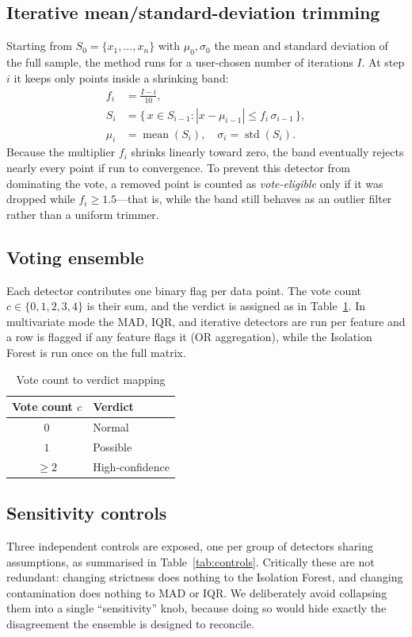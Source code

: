 \documentclass[conference]{IEEEtran}
\begin{document}
\subsection{Iterative mean/standard-deviation trimming}
Starting from $S_0 = \{x_1,\dots,x_n\}$ with $\mu_0,\sigma_0$ the mean and standard deviation of the full sample, the method runs for a user-chosen number of iterations $I$. At step $i$ it keeps only points inside a shrinking band:
\begin{align}
f_i &= \frac{I - i}{10}, \\
S_i &= \{\, x \in S_{i-1} : |x - \mu_{i-1}| \le f_i\,\sigma_{i-1} \,\}, \\
\mu_i &= \operatorname{mean}(S_i), \quad \sigma_i = \operatorname{std}(S_i).
\end{align}
Because the multiplier $f_i$ shrinks linearly toward zero, the band eventually rejects nearly every point if run to convergence. To prevent this detector from dominating the vote, a removed point is counted as \textit{vote-eligible} only if it was dropped while $f_i \ge 1.5$---that is, while the band still behaves as an outlier filter rather than a uniform trimmer.

\subsection{Voting ensemble}
Each detector contributes one binary flag per data point. The vote count $c \in \{0,1,2,3,4\}$ is their sum, and the verdict is assigned as in Table~\ref{tab:vote}. In multivariate mode the MAD, IQR, and iterative detectors are run per feature and a row is flagged if any feature flags it (OR aggregation), while the Isolation Forest is run once on the full matrix.

\begin{table}[t]
\caption{Vote count to verdict mapping}
\label{tab:vote}
\centering
\begin{tabular}{cl}
\hline
\textbf{Vote count $c$} & \textbf{Verdict} \\
\hline
$0$ & Normal \\
$1$ & Possible \\
$\ge 2$ & High-confidence \\
\hline
\end{tabular}
\end{table}

\subsection{Sensitivity controls}
Three independent controls are exposed, one per group of detectors sharing assumptions, as summarised in Table~\ref{tab:controls}. Critically these are not redundant: changing strictness does nothing to the Isolation Forest, and changing contamination does nothing to MAD or IQR. We deliberately avoid collapsing them into a single ``sensitivity'' knob, because doing so would hide exactly the disagreement the ensemble is designed to reconcile.
\end{document}
